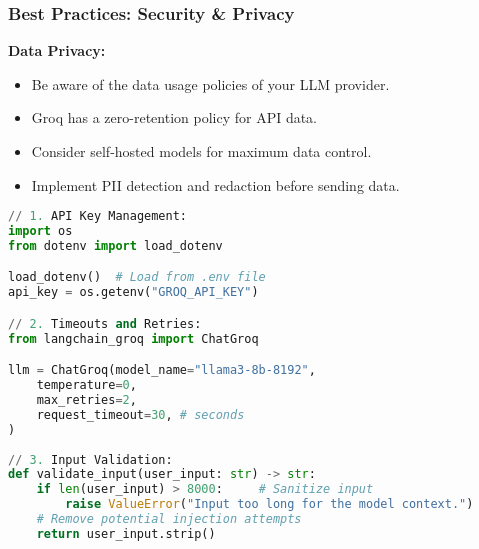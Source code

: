 \begin{frame}[fragile]\frametitle{Best Practices: Security \& Privacy}

\textbf{Data Privacy:}
\begin{itemize}
\item Be aware of the data usage policies of your LLM provider.
\item Groq has a zero-retention policy for API data.
\item Consider self-hosted models for maximum data control.
\item Implement PII detection and redaction before sending data.
\end{itemize}

\begin{lstlisting}[language=python, basicstyle=\tiny]
// 1. API Key Management:
import os
from dotenv import load_dotenv

load_dotenv()  # Load from .env file
api_key = os.getenv("GROQ_API_KEY")

// 2. Timeouts and Retries:
from langchain_groq import ChatGroq

llm = ChatGroq(model_name="llama3-8b-8192",
    temperature=0,
    max_retries=2,
    request_timeout=30, # seconds
)
	
// 3. Input Validation:
def validate_input(user_input: str) -> str:
    if len(user_input) > 8000:     # Sanitize input
        raise ValueError("Input too long for the model context.")
    # Remove potential injection attempts
    return user_input.strip()
\end{lstlisting}

\end{frame}

